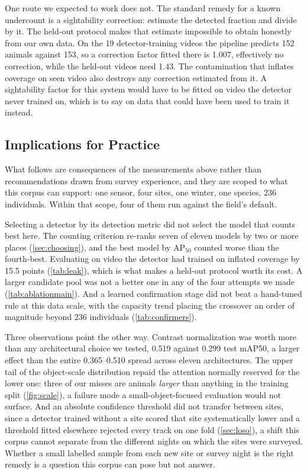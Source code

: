 One route we expected to work does not. The standard remedy for a known undercount is a
sightability correction: estimate the detected fraction and divide by it. The held-out
protocol makes that estimate impossible to obtain honestly from our own data. On the 19
detector-training videos the pipeline predicts 152 animals against 153, so a correction factor
fitted there is 1.007, effectively no correction, while the held-out videos need 1.43. The
contamination that inflates coverage on seen video also destroys any correction estimated from
it. A sightability factor for this system would have to be fitted on video the detector never
trained on, which is to say on data that could have been used to train it instead.

\subsection{Implications for Practice}

What follows are consequences of the measurements above rather than recommendations drawn
from survey experience, and they are scoped to what this corpus can support: one sensor, four
sites, one winter, one species, 236 individuals. Within that scope, four of them run against
the field's default.

Selecting a detector by its detection metric did not select the model that counts best here.
The counting criterion re-ranks seven of eleven models by two or more places
(\cref{sec:choosing}), and the best model by AP$_{50}$ counted worse than the fourth-best.
Evaluating on video the detector had trained on inflated coverage by 15.5 points
(\cref{tab:leak}), which is what makes a held-out protocol worth its cost. A larger candidate
pool was not a better one in any of the four attempts we made (\cref{tab:ablationmain}). And a
learned confirmation stage did not beat a hand-tuned rule at this data scale, with the capacity
trend placing the crossover an order of magnitude beyond 236 individuals
(\cref{tab:confirmers}).

Three observations point the other way. Contrast normalization was worth more than any
architectural choice we tested, 0.519 against 0.299 test mAP50, a larger effect than the entire 0.365--0.510 spread across eleven architectures. The upper tail of the object-scale
distribution repaid the attention normally reserved for the lower one: three of our misses are
animals \emph{larger} than anything in the training split (\cref{fig:scale}), a failure mode a
small-object-focused evaluation would not surface. And an absolute confidence threshold did not
transfer between sites, since a detector trained without a site scored that site systematically lower and a threshold
fitted elsewhere rejected every track on one fold (\cref{sec:loso}), a shift this corpus cannot
separate from the different nights on which the sites were surveyed.
Whether a small labelled sample from each new site or survey night is the right remedy is a question this
corpus can pose but not answer.

